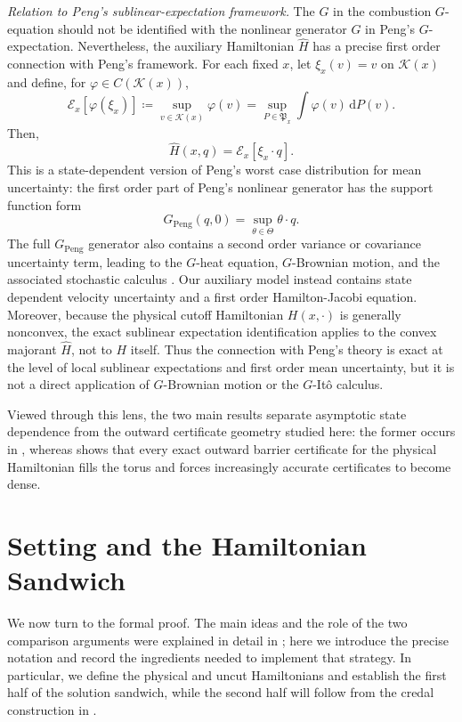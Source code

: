 \documentclass[11pt,reqno,noamsfonts]{amsart}
\theoremstyle{definition}
\theoremstyle{remark}
\begin{document}
\textit{Relation to Peng's sublinear-expectation framework.}
The $G$ in the combustion $G$-equation should not be identified with
the nonlinear generator $G$ in Peng's $G$-expectation. Nevertheless,
the auxiliary Hamiltonian $\widehat H$ has a precise first order
connection with Peng's framework. For each fixed $x$, let
$\xi_x(v)=v$ on $\mathcal K(x)$ and define, for
$\varphi\in C(\mathcal K(x))$,
\[
  \mathcal E_x[\varphi(\xi_x)]
  \coloneqq
  \sup_{v\in\mathcal K(x)}\varphi(v)
  =
  \sup_{P\in\mathfrak P_x}
  \int \varphi(v)\,\mathrm dP(v).
\]
Then,
\[
  \widehat H(x,q)
  =
  \mathcal E_x[\xi_x\cdot q].
\]
This is a state-dependent version of Peng's worst case distribution for
mean uncertainty: the first order part of Peng's nonlinear generator \cite{Peng2008}
has the support function form
\[
  G_{\mathrm{Peng}}(q,0)
  =
  \sup_{\theta\in\Theta}\theta\cdot q.
\]
The full $G_{\mathrm{Peng}}$ generator also contains a second order
variance or covariance uncertainty term, leading to the $G$-heat
equation, $G$-Brownian motion, and the associated stochastic calculus
\cite{Peng2007}. Our auxiliary model instead contains state dependent
velocity uncertainty and a first order Hamilton-Jacobi equation.
Moreover, because the physical cutoff Hamiltonian $H(x,\cdot)$ is
generally nonconvex, the exact sublinear expectation identification
applies to the convex majorant $\widehat H$, not to $H$ itself. Thus the
connection with Peng's theory is exact at the level of local sublinear
expectations and first order mean uncertainty, but it is not a direct
application of $G$-Brownian motion or the $G$-It\^o calculus.

Viewed through this lens, the two main results separate asymptotic state
dependence from the outward certificate geometry studied here: the
former occurs in , whereas  shows
that every exact outward barrier certificate for the physical
Hamiltonian fills the torus and forces increasingly accurate
certificates to become dense.

\section{Setting and the Hamiltonian Sandwich}\label{sec:setting}
We now turn to the formal proof. The main ideas and the role of the two
comparison arguments were explained in detail in ; here we introduce the precise notation and record the ingredients
needed to implement that strategy. In particular, we define the physical
and uncut Hamiltonians and establish the first half of the solution
sandwich, while the second half will follow from the credal construction
in .
\end{document}
